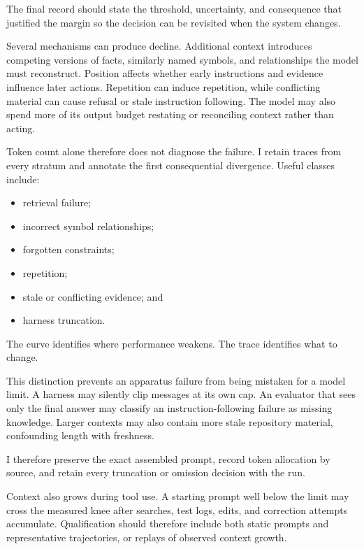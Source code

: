 The final record should state the threshold, uncertainty, and consequence that justified the margin so the decision can be revisited when the system changes.

Several mechanisms can produce decline. Additional context introduces competing versions of facts, similarly named symbols, and relationships the model must reconstruct. Position affects whether early instructions and evidence influence later actions. Repetition can induce repetition, while conflicting material can cause refusal or stale instruction following. The model may also spend more of its output budget restating or reconciling context rather than acting.


Token count alone therefore does not diagnose the failure. I retain traces from every stratum and annotate the first consequential divergence. Useful classes include:

\begin{itemize}
\tightlist
\item
  retrieval failure;
\item
  incorrect symbol relationships;
\item
  forgotten constraints;
\item
  repetition;
\item
  stale or conflicting evidence; and
\item
  harness truncation.
\end{itemize}

The curve identifies where performance weakens. The trace identifies what to change.

This distinction prevents an apparatus failure from being mistaken for a model limit. A harness may silently clip messages at its own cap. An evaluator that sees only the final answer may classify an instruction-following failure as missing knowledge. Larger contexts may also contain more stale repository material, confounding length with freshness.

I therefore preserve the exact assembled prompt, record token allocation by source, and retain every truncation or omission decision with the run.

Context also grows during tool use. A starting prompt well below the limit may cross the measured knee after searches, test logs, edits, and correction attempts accumulate. Qualification should therefore include both static prompts and representative trajectories, or replays of observed context growth.

